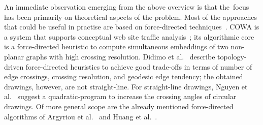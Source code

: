 \documentclass[runningheads]{llncs}
\begin{document}
An immediate observation emerging from the above overview is that the~focus has been primarily on theoretical aspects of the problem. Most of the approaches that could be useful in practise are based on force-directed techniques~\cite{DBLP:books/ph/BattistaETT99,DBLP:journals/congnum/Eades84}. COWA is a system that supports conceptual web site traffic analysis~\cite{DBLP:conf/apvis/DidimoLR10}; its algorithmic core is a force-directed heuristic to compute simultaneous embeddings of two non-planar graphs with high crossing resolution. 
%
Didimo et al.~\cite{DBLP:conf/gd/DidimoLR10} describe topology-driven force-directed heuristics to achieve good trade-offs in terms of number of edge crossings, crossing resolution, and geodesic edge tendency; the obtained drawings, however, are not straight-line. 
%
For straight-line drawings, Nguyen et al.~\cite{DBLP:conf/gd/NguyenEHH10} suggest a quadratic-program to increase the crossing angles of circular drawings. 
%
Of more general scope are the already mentioned force-directed algorithms of Argyriou et al.~\cite{DBLP:journals/cj/ArgyriouBS13} and Huang et al.~\cite{DBLP:journals/vlc/HuangEHL13}.


\end{document}
